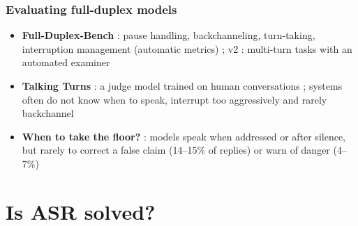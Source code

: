 \documentclass[table]{beamer}
\newif\ifquiz
\newcommand{\wooclapurl}{https://app.wooclap.com/COMNGOJ}
\newcommand{\quizbreak}[2]{\ifquiz%
\begin{frame}
\frametitle{Quiz break #1/5}
\begin{columns}[c]
\begin{column}{0.45\textwidth}
\centering
\qrcode[height=4.6cm]{\wooclapurl}
\end{column}
\begin{column}{0.53\textwidth}
{\Large\bfseries\color{titleink} Scan and answer}\par\vspace*{0.8em}
{\large #2 questions $\cdot$ 2 minutes}\par\vspace*{1.2em}
\small or go to \textbf{\href{\wooclapurl}{app.wooclap.com/COMNGOJ}}\par\vspace*{0.3em}
event code: \textbf{COMNGOJ}
\end{column}
\end{columns}
\end{frame}\fi}
\begin{document}
\begin{frame}
\frametitle{Evaluating full-duplex models}
\small
\begin{itemize}
	\item \textbf{Full-Duplex-Bench} \citep{lin2025fdb}: pause handling, backchanneling, turn-taking, interruption management (automatic metrics) ; v2 \citep{lin2025fdbv2}: multi-turn tasks with an automated examiner
	\item \textbf{Talking Turns} \citep{arora2025talkingturns}: a judge model trained on human conversations ; systems often do not know when to speak, interrupt too aggressively and rarely backchannel
	\item \textbf{When to take the floor?} \citep{peng2026takefloor}: models speak when addressed or after silence, but rarely to correct a false claim (14--15\% of replies) or warn of danger (4--7\%)
\end{itemize}
\vspace*{0.5em}
\begin{center}
\end{center}
\end{frame}






\quizbreak{5}{3}

\section{Is ASR solved?}

\frame{\tableofcontents[currentsection]}
\end{document}
